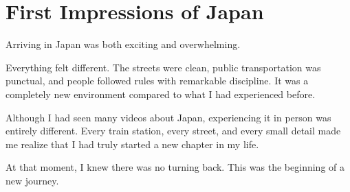 \section{First Impressions of Japan}

Arriving in Japan was both exciting and overwhelming.

Everything felt different. The streets were clean, public transportation was punctual, and people followed rules with remarkable discipline. It was a completely new environment compared to what I had experienced before.

Although I had seen many videos about Japan, experiencing it in person was entirely different. Every train station, every street, and every small detail made me realize that I had truly started a new chapter in my life.

At that moment, I knew there was no turning back. This was the beginning of a new journey.